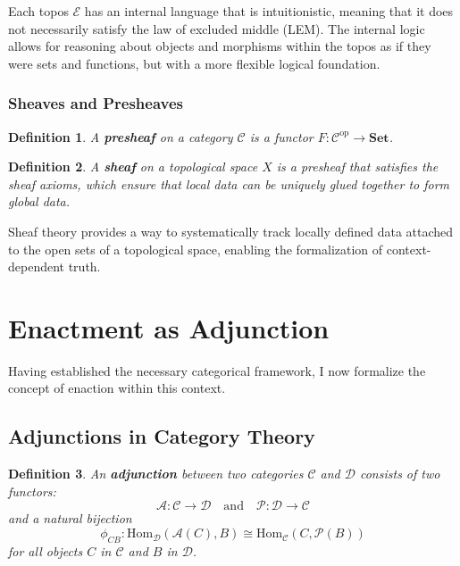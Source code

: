 \documentclass{article}
\newtheorem{definition}{Definition}[section]
\begin{document}
Each topos $\mathcal{E}$ has an internal language that is intuitionistic, meaning that it does not necessarily satisfy the law of excluded middle (LEM). The internal logic allows for reasoning about objects and morphisms within the topos as if they were sets and functions, but with a more flexible logical foundation.

\subsubsection{Sheaves and Presheaves}

\begin{definition}
A \textbf{presheaf} on a category $\mathcal{C}$ is a functor $F \colon \mathcal{C}^{\text{op}} \to \mathbf{Set}$.
\end{definition}

\begin{definition}
A \textbf{sheaf} on a topological space $X$ is a presheaf that satisfies the sheaf axioms, which ensure that local data can be uniquely glued together to form global data.
\end{definition}

Sheaf theory provides a way to systematically track locally defined data attached to the open sets of a topological space, enabling the formalization of context-dependent truth.

\section{Enactment as Adjunction}

Having established the necessary categorical framework, I now formalize the concept of enaction within this context.

\subsection{Adjunctions in Category Theory}

\begin{definition}
An \textbf{adjunction} between two categories $\mathcal{C}$ and $\mathcal{D}$ consists of two functors:
\[
\mathcal{A} \colon \mathcal{C} \to \mathcal{D} \quad \text{and} \quad \mathcal{P} \colon \mathcal{D} \to \mathcal{C}
\]
and a natural bijection
\[
\phi_{CB} \colon \text{Hom}_{\mathcal{D}} ( \mathcal{A}(C), B ) \cong \text{Hom}_{\mathcal{C}} (C, \mathcal{P}(B))
\]
for all objects $C$ in $\mathcal{C}$ and $B$ in $\mathcal{D}$.
\end{definition}
\end{document}
